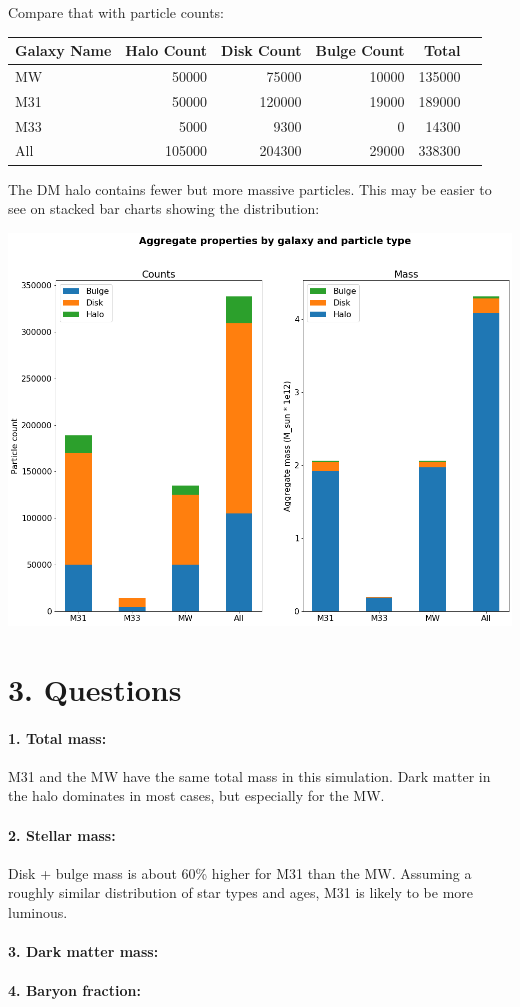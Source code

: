 Compare that with particle counts:\\

\begin{tabular}{lrrrrr}
	\toprule
	\textbf{Galaxy Name} &  \textbf{Halo Count}  &  \textbf{Disk Count} &  \textbf{Bulge Count} &  \textbf{Total} \\
	\midrule
	MW   &   50000 &   75000 &    10000 &  135000 \\
	M31  &   50000 &  120000 &    19000 &  189000 \\
	M33  &    5000 &    9300 &        0 &   14300 \\
	\midrule
	All  &  105000 &  204300 &    29000 &  338300 \\
	\bottomrule
\end{tabular}\vspace{5mm}

The DM halo contains fewer but more massive particles. This may be easier to see on stacked bar charts showing the distribution:

{\centering \includegraphics[scale=0.5]{stackedbar} \par}

\section*{3. Questions}

\paragraph{1. Total mass:} M31 and the MW have the same total mass in this simulation. Dark matter in the halo dominates in most cases, but especially for the MW.

\paragraph{2. Stellar mass:} Disk + bulge mass is about 60\% higher for M31 than the MW. Assuming a roughly similar distribution of star types and ages, M31 is likely to be more luminous.

\paragraph{3. Dark matter mass:} 

\paragraph{4. Baryon fraction:} 


